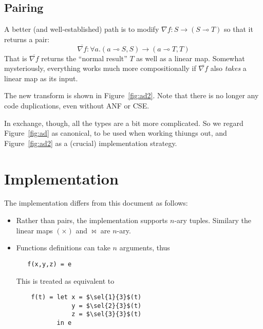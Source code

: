 \documentclass[sigplan,review]{acmart}
\renewcommand{\to}{\rightarrow}    %
\newcommand{\linto}{\multimap}     %
\newcommand{\gradf}[1]{\nabla\! #1}  %
\newcommand{\ogradf}[1]{\overline{\gradf{#1}}}  %
\newcommand{\sel}[2]{\pi_{#1,#2}}
\newcommand{\real}{\mathbb{R}}       %
\newcommand{\lmpair}{\times}         %
\newcommand{\lmjoin}{\bowtie}        %
\newcommand{\tom}[1]{}
\newcommand{\awf}[1]{}
\begin{document}
\tom{Consider $exp(exp(x))$.  I consider its ``symbolic derivative''
  to be $exp(exp(x)) exp(x)$ and its ``forward automatic derivative''
  to be $let~ y = exp(x)~ in~ exp(y) y$.  In other words, taking
  proper care of sharing is what makes AD AD and not just any old form
  of symbolic differentiation, in my personal nomenclature at least.
  Does that make it any clearer what I mean?}
  \awf{For me, ``AD'' very specifically implies a second argument to the function.   That's how you detect it's AD.  I.e.  $f'(x,dx) = ....$ is forward mode, and $f`(x,df) = ...$ is reverse mode.  There's a lot of chat about what AD really is, and those who want to avoid such chat often now say ``algorithmic differentiation'', to mean ``all this stuff''.  The real claim we want to explore is this: ``Forward mode is good for functions with small inputs and large outputs, e.g. $\real \mapsto \real^n$, and reverse mode is for $\real^n \mapsto \real$.}

\subsection{Pairing}

A better (and well-established) path is to modify $\gradf{f} : S \to (S \linto T)$ so that
it returns a pair:
$$
   \ogradf{f}  :  \forall a. (a \linto S, S) \to (a \linto T, T)
$$
That is $\ogradf{f}$ returns the ``normal result'' $T$ as well as a linear map.
Somewhat mysteriously, everything works much more compositionally if $\ogradf{f}$ also \emph{takes} a linear map as its input.

The new transform is shown in Figure~\ref{fig:ad2}. Note that there is no longer any code duplications, even without ANF or CSE.

In exchange, though, all the types are a bit more complicated.  So we regard Figure~\ref{fig:ad} as canonical, to be used when working thiungs out, and Figure~\ref{fig:ad2} as a (crucial) implementation strategy.

\section{Implementation}

The implementation differs from this document as follows:
\begin{itemize}
\item Rather than pairs, the implementation supports $n$-ary tuples.
  Similary the linear maps $(\lmpair)$ and $\lmjoin$ are $n$-ary.
\item Functions definitions can take $n$ arguments, thus
  \begin{lstlisting}
   f(x,y,z) = e
  \end{lstlisting}
  This is treated as equivalent to
  \begin{lstlisting}
    f(t) = let x = $\sel{1}{3}$(t)
               y = $\sel{2}{3}$(t)
               z = $\sel{3}{3}$(t)
           in e
  \end{lstlisting}
\end{itemize}
\end{document}

